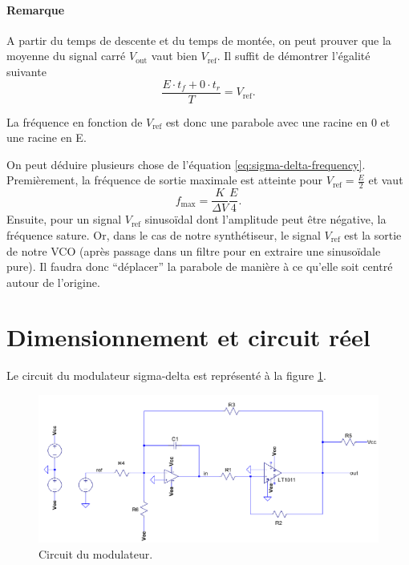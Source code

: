 \paragraph{Remarque}
A partir du temps de descente et du temps de montée, on
peut prouver que la moyenne du signal carré $V_{\text{out}}$
vaut bien $V_{\text{ref}}$. Il suffit de démontrer l'égalité
suivante
\[ \frac{E \cdot t_f + 0 \cdot t_r}{T} = V_{\text{ref}}.\]

La fréquence en fonction de $V_{\text{ref}}$ est donc
une parabole avec une racine en \unit{0}{\volt} et une
racine en \unit{E}{\volt}.

On peut déduire plusieurs chose de l'équation \ref{eq:sigma-delta-frequency}. 
Premièrement, la fréquence de sortie maximale est atteinte pour 
$V_{\text{ref}} = \frac{E}{2}$ et vaut
\[ f_{\text{max}} = \frac{K}{\Delta V}\frac{E}{4}. \]
Ensuite, pour un signal $V_{\text{ref}}$ sinusoïdal dont
l'amplitude peut être négative, la fréquence sature.
Or, dans le cas de notre synthétiseur, le signal $V_{\text{ref}}$
est la sortie de notre VCO (après passage dans un filtre pour
en extraire une sinusoïdale pure).
Il faudra donc ``déplacer'' la parabole de manière à ce qu'elle soit
centré autour de l'origine.

\section{Dimensionnement et circuit réel}
Le circuit du modulateur sigma-delta est représenté
à la figure \ref{fig:sigma-delta-circuit}.

\begin{figure}[ht]
	\centering
	\includegraphics[scale=0.7]{img/sigma-delta-circuit.png}
	\caption{Circuit du modulateur.}
	\label{fig:sigma-delta-circuit}
\end{figure}

